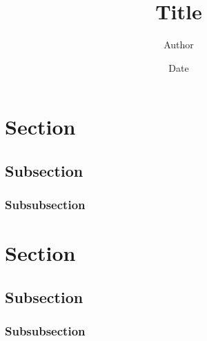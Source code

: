 \documentclass[10pt,twocolumn,small,compact]{khhandout}
\title{Title}
\author{Author}
\date{Date}
\begin{document}
\maketitle

\lipsum[1][1-5]

\section{Section}
\lipsum[1-2]

\subsection{Subsection}
\lipsum[2-3]

\subsubsection{Subsubsection}
\lipsum[4-5]

\section{Section}
\subsection{Subsection}
\subsubsection{Subsubsection}
\lipsum[6-7]
\end{document}
